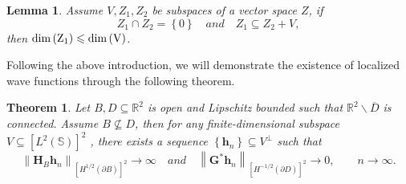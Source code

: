 \documentclass[11pt,reqno,twoside]{amsart}
\newtheorem{thm}{Theorem}[section]
\newtheorem{lem}{Lemma}[section]
\theoremstyle{definition}
\theoremstyle{remark}
\numberwithin{equation}{section}
\begin{document}
\begin{lem}\label{Dim}%
	Assume $V, Z_1, Z_2 $ be subspaces of a vector space $Z$, if 
	$$
	Z_1 \cap Z_2= \left\lbrace 0 \right\rbrace \quad and \quad Z_1 \subseteq Z_2 +V,
	$$
	then $\rm {dim}\left(  Z_1 \right) \leqslant \rm {dim}\left(  V \right) $.
\end{lem}
Following the above introduction, we will demonstrate the existence of localized wave functions through the following theorem. 
\begin{thm}\label{LocialWaveFounc}
 Let $B, D  \subseteq \mathbb R^2$ is open and Lipschitz bounded such that $\mathbb R^2 \backslash \overline {D}$ is connected. Assume $B \nsubseteq D$, then for any finite-dimensional subspace $V \subseteq \left[L^{2}\left(\mathbb S\right) \right] ^2 $ , there exists a sequence $\left\lbrace  \mathbf h_n \right\rbrace  \subseteq  V^{\perp} $ such that
 $$
 \left\|\mathbf H_B \mathbf h_n\right\|_{\left[H^{1/2}\left(\partial B\right) \right] ^2 } \to \infty \quad and \quad \left\| \mathbf G^* \mathbf h_n\right\|_{\left[H^{-1/2}\left(\partial D\right) \right] ^2 } \to 0, \qquad n\to \infty.
 $$
\end{thm}
\end{document}
